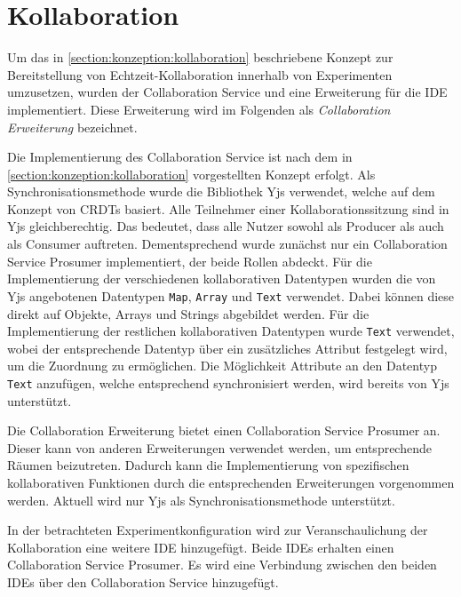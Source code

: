 \section{Kollaboration}\label{section:prototypische-implementierung:kollaboration}


Um das in \autoref{section:konzeption:kollaboration} beschriebene Konzept zur Bereitstellung von Echtzeit-Kollaboration innerhalb von Experimenten umzusetzen, wurden der Collaboration Service und eine Erweiterung für die IDE implementiert. Diese Erweiterung wird im Folgenden als \textit{Collaboration Erweiterung} bezeichnet.

Die Implementierung des Collaboration Service ist nach dem in \autoref{section:konzeption:kollaboration} vorgestellten Konzept erfolgt. Als Synchronisationsmethode wurde die Bibliothek Yjs \cite{noauthor_yjs_nodate} verwendet, welche auf dem Konzept von \acp{CRDT} basiert. Alle Teilnehmer einer Kollaborationssitzung sind in Yjs gleichberechtig. Das bedeutet, dass alle Nutzer sowohl als Producer als auch als Consumer auftreten. Dementsprechend wurde zunächst nur ein Collaboration Service Prosumer implementiert, der beide Rollen abdeckt. Für die Implementierung der verschiedenen kollaborativen Datentypen wurden die von Yjs angebotenen Datentypen \texttt{Map}, \texttt{Array} und \texttt{Text} verwendet. Dabei können diese direkt auf Objekte, Arrays und Strings abgebildet werden. Für die Implementierung der restlichen kollaborativen Datentypen wurde \texttt{Text} verwendet, wobei der entsprechende Datentyp über ein zusätzliches Attribut festgelegt wird, um die Zuordnung zu ermöglichen. Die Möglichkeit Attribute an den Datentyp \texttt{Text} anzufügen, welche entsprechend synchronisiert werden, wird bereits von Yjs unterstützt.

Die Collaboration Erweiterung bietet einen Collaboration Service Prosumer an. Dieser kann von anderen Erweiterungen verwendet werden, um entsprechende Räumen beizutreten. Dadurch kann die Implementierung von spezifischen kollaborativen Funktionen durch die entsprechenden Erweiterungen vorgenommen werden. Aktuell wird nur Yjs als Synchronisationsmethode unterstützt.

In der betrachteten Experimentkonfiguration wird zur Veranschaulichung der Kollaboration eine weitere IDE hinzugefügt. Beide IDEs erhalten einen Collaboration Service Prosumer. Es wird eine Verbindung zwischen den beiden IDEs über den Collaboration Service hinzugefügt.
